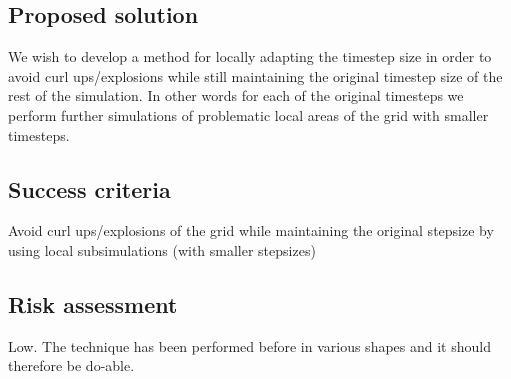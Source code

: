 \documentclass[11pt,a4paper]{article}
\begin{document}
\subsection{Proposed solution}
We wish to develop a method for locally adapting the timestep size in
order to avoid curl ups/explosions while still maintaining the original
timestep size of the rest of the simulation. In other words for each of
the original timesteps we perform further simulations of problematic local
areas of the grid with smaller timesteps.

\subsection{Success criteria}
Avoid curl ups/explosions of the grid while maintaining the original
stepsize by using local subsimulations (with smaller stepsizes)

\subsection{Risk assessment}
Low. The technique has been performed before in various shapes and it
should therefore be do-able.
\end{document}

